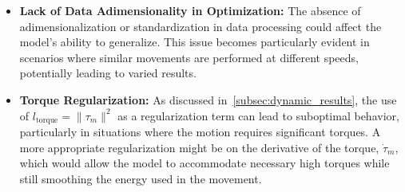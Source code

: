 \begin{itemize}
    \item \textbf{Lack of Data Adimensionality in Optimization:} The absence of adimensionalization or standardization in data processing could 
    affect the model's ability to generalize. This issue becomes particularly evident in scenarios where similar movements are performed at 
    different speeds, potentially leading to varied results.

    \item \textbf{Torque Regularization:} As discussed in~\cref{subsec:dynamic_results}, the use 
    of \(l_{\text{torque}} = \|\tau_m\|^2\) as a regularization term can lead to suboptimal 
    behavior, particularly in situations where the motion requires significant torques. 
    A more appropriate regularization might be on the derivative of the torque, \(\dot{\tau}_m\), which 
    would allow the model to accommodate necessary high torques while still smoothing the energy used in the movement.

\end{itemize}